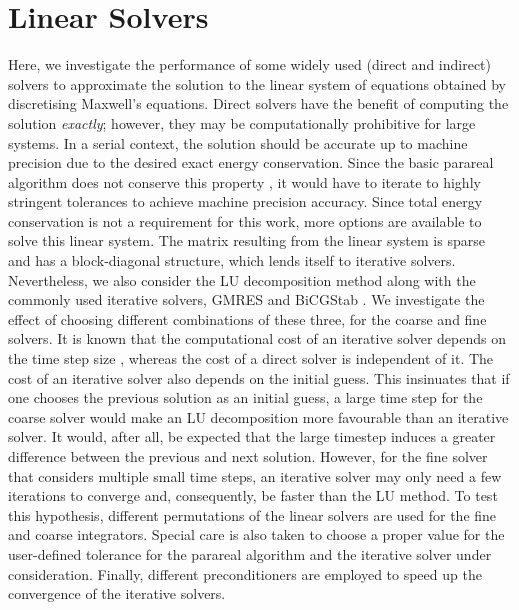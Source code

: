 
\section{Linear Solvers}

Here, we investigate the performance of some widely used (direct and indirect) solvers to approximate the solution to the linear system of equations obtained by discretising Maxwell's equations. Direct solvers have the benefit of computing the solution \textit{exactly}; however, they may be computationally prohibitive for large systems. In a serial context, the solution should be accurate up to machine precision due to the desired exact energy conservation. Since the basic parareal algorithm does not conserve this property \cite{gander_analysis_2014}, it would have to iterate to highly stringent tolerances to achieve machine precision accuracy. Since total energy conservation is not a requirement for this work, more options are available to solve this linear system. The matrix resulting from the linear system is sparse and has a block-diagonal structure, which lends itself to iterative solvers. 
Nevertheless, we also consider the LU decomposition method along with the commonly used iterative solvers, GMRES and BiCGStab \cite{youcef_saad_martin_h_schultz_gmres_1986,van_der_vorst_bi-cgstab_1992}. We investigate the effect of choosing different combinations of these three, for the coarse and fine solvers. It is known that the computational cost of an iterative solver depends on the time step size \cite{einkemmer_adaptive_2018, hochbruck_exponential_1998}, whereas the cost of a direct solver is independent of it. The cost of an iterative solver also depends on the initial guess. This insinuates that if one chooses the previous solution as an initial guess, a large time step for the coarse solver would make an LU decomposition more favourable than an iterative solver. It would, after all, be expected that the large timestep induces a greater difference between the previous and next solution. However, for the fine solver that considers multiple small time steps, an iterative solver may only need a few iterations to converge and, consequently, be faster than the LU method. To test this hypothesis, different permutations of the linear solvers are used for the fine and coarse integrators. Special care is also taken to choose a proper value for the user-defined tolerance for the parareal algorithm and the iterative solver under consideration. Finally, different preconditioners are employed to speed up the convergence of the iterative solvers.

